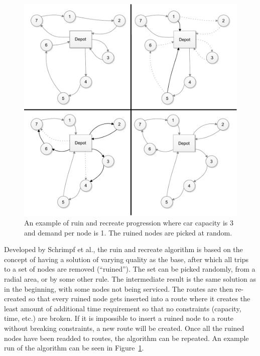 \begin{figure}[h]
  \begin{center}
    \includegraphics[width=\textwidth]{images/ruinrecreate.pdf}
    \caption{An example of ruin and recreate progression where car capacity is 3 and demand per node is 1. The ruined nodes are picked at random.}
    \label{fig:ruinrecreate}
  \end{center}
\end{figure}

Developed by Schrimpf et al., the ruin and recreate algorithm is based on the concept of having a solution of varying quality as the base, after which all trips to a set of nodes are removed (``ruined''). The set can be picked randomly, from a radial area, or by some other rule. The intermediate result is the same solution as in the beginning, with some nodes not being serviced. The routes are then re-created so that every ruined node gets inserted into a route where it creates the least amount of additional time requirement so that no constraints (capacity, time, etc.) are broken. If it is impossible to insert a ruined node to a route without breaking constraints, a new route will be created. Once all the ruined nodes have been readded to routes, the algorithm can be repeated. An example run of the algorithm can be seen in Figure~\ref{fig:ruinrecreate}. \cite{schrimpf2000record} 



